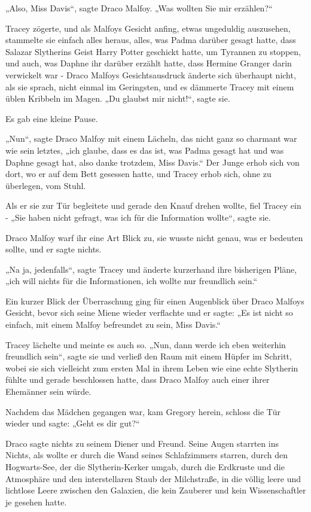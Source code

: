 {„Also, Miss Davis“, sagte Draco Malfoy. „Was wollten Sie mir erzählen?“

Tracey zögerte, und als Malfoys Gesicht anfing, etwas ungeduldig auszusehen, stammelte sie einfach alles heraus, alles, was Padma darüber gesagt hatte, dass Salazar Slytherins Geist Harry Potter geschickt hatte, um Tyrannen zu stoppen, und auch, was Daphne ihr darüber erzählt hatte, dass Hermine Granger darin verwickelt war - Draco Malfoys Gesichtsausdruck änderte sich überhaupt nicht, als sie sprach, nicht einmal im Geringsten, und es dämmerte Tracey mit einem üblen Kribbeln im Magen. „Du glaubst mir nicht!“, sagte sie.

Es gab eine kleine Pause.

„Nun“, sagte Draco Malfoy mit einem Lächeln, das nicht ganz so charmant war wie sein letztes, „ich glaube, dass es das ist, was Padma gesagt hat und was Daphne gesagt hat, also danke trotzdem, Miss Davis.“ Der Junge erhob sich von dort, wo er auf dem Bett gesessen hatte, und Tracey erhob sich, ohne zu überlegen, vom Stuhl.

Als er sie zur Tür begleitete und gerade den Knauf drehen wollte, fiel Tracey ein - „Sie haben nicht gefragt, was ich für die Information wollte“, sagte sie.

Draco Malfoy warf ihr eine Art Blick zu, sie wusste nicht genau, was er bedeuten sollte, und er sagte nichts.

„Na ja, jedenfalls“, sagte Tracey und änderte kurzerhand ihre bisherigen Pläne, „ich will nichts für die Informationen, ich wollte nur freundlich sein.“

Ein kurzer Blick der Überraschung ging für einen Augenblick über Draco Malfoys Gesicht, bevor sich seine Miene wieder verflachte und er sagte: „Es ist nicht so einfach, mit einem Malfoy befreundet zu sein, Miss Davis.“

Tracey lächelte und meinte es auch so. „Nun, dann werde ich eben weiterhin freundlich sein“, sagte sie und verließ den Raum mit einem Hüpfer im Schritt, wobei sie sich vielleicht zum ersten Mal in ihrem Leben wie eine echte Slytherin fühlte und gerade beschlossen hatte, dass Draco Malfoy auch einer ihrer Ehemänner sein würde.

Nachdem das Mädchen gegangen war, kam Gregory herein, schloss die Tür wieder und sagte: „Geht es dir gut?“

Draco sagte nichts zu seinem Diener und Freund. Seine Augen starrten ins Nichts, als wollte er durch die Wand seines Schlafzimmers starren, durch den Hogwarts-See, der die Slytherin-Kerker umgab, durch die Erdkruste und die Atmosphäre und den interstellaren Staub der Milchstraße, in die völlig leere und lichtlose Leere zwischen den Galaxien, die kein Zauberer und kein Wissenschaftler je gesehen hatte.

}

